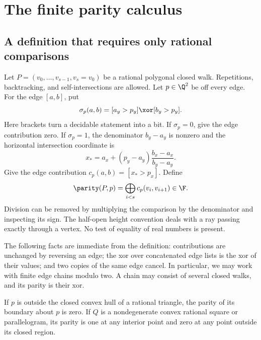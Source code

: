 \section{The finite parity calculus}\label{sec:parity}

\subsection{A definition that requires only rational comparisons}

Let $P=(v_0,\ldots,v_{s-1},v_s=v_0)$ be a rational polygonal
closed walk. Repetitions, backtracking, and self-intersections are allowed.
Let $p\in\Q^2$ be off every edge. For the edge $[a,b]$, put
\[
 \sigma_p(a,b)=[a_y>p_y]\xor[b_y>p_y].
\]
Here brackets turn a decidable statement into a bit. If $\sigma_p=0$,
give the edge contribution zero. If $\sigma_p=1$, the denominator
$b_y-a_y$ is nonzero and the horizontal intersection coordinate is
\[
 x_* = a_x+(p_y-a_y)\frac{b_x-a_x}{b_y-a_y}.
\]
Give the edge contribution $c_p(a,b)=[x_*>p_x]$. Define
\begin{equation}
 \parity(P,p)=\bigoplus_{i<s}c_p(v_i,v_{i+1})\in\F.
 \label{eq:parity}
\end{equation}
Division can be removed by multiplying the comparison by the denominator
and inspecting its sign. The half-open height convention deals with a
ray passing exactly through a vertex. No test of equality of real
numbers is present.

The following facts are immediate from the definition: contributions
are unchanged by reversing an edge; the xor over concatenated edge
lists is the xor of their values; and two copies of the same edge cancel.
In particular, we may work with finite edge chains modulo two. A chain
may consist of several closed walks, and its parity is their xor.

\begin{lemma}\label{lem:triangle}
If $p$ is outside the closed convex hull of a rational triangle, the
parity of its boundary about $p$ is zero. If $Q$ is a nondegenerate
convex rational square or parallelogram, its parity is one at any
interior point and zero at any point outside its closed region.
\end{lemma}

